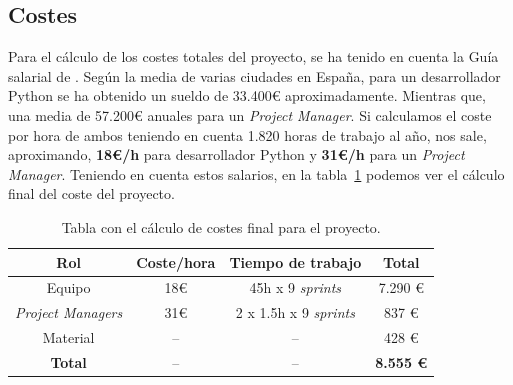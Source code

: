 \subsection{Costes}
Para el cálculo de los costes totales del proyecto, se ha tenido en cuenta la Guía salarial de \citet{hays2022}. Según la media de varias ciudades en España, para un desarrollador Python se ha obtenido un sueldo de 33.400€ aproximadamente. Mientras que, una media de 57.200€ anuales para un \textit{Project Manager}. Si calculamos el coste por hora de ambos teniendo en cuenta 1.820 horas de trabajo al año, nos sale, aproximando, \textbf{18€/h} para desarrollador Python y \textbf{31€/h} para un \textit{Project Manager}. Teniendo en cuenta estos salarios, en la tabla~\ref{tab:metodologia/costes} podemos ver el cálculo final del coste del proyecto.

\begin{table}[H]
    \centering
    {
    \setlength{\tabcolsep}{1\tabcolsep}
    \begin{tabular}{|c|c|c|c|}
        \hline
        \rowcolor{udcpink!25}
        \textbf{Rol} & \textbf{Coste/hora} & \textbf{Tiempo de trabajo} & \textbf{Total} \\ \hline
        Equipo & 18€ & 45h x 9 \textit{sprints} & 7.290 € \\ \hline
        \textit{Project Managers} & 31€ & 2 x 1.5h x 9 \textit{sprints} & 837 € \\ \hline
        Material & -- & -- & 428 € \\ \hline
        \textbf{Total} & -- & -- & \textbf{8.555 €} \\ \hline

    \end{tabular}%
    }
    \caption{Tabla con el cálculo de costes final para el proyecto.}
    \label{tab:metodologia/costes}
\end{table}